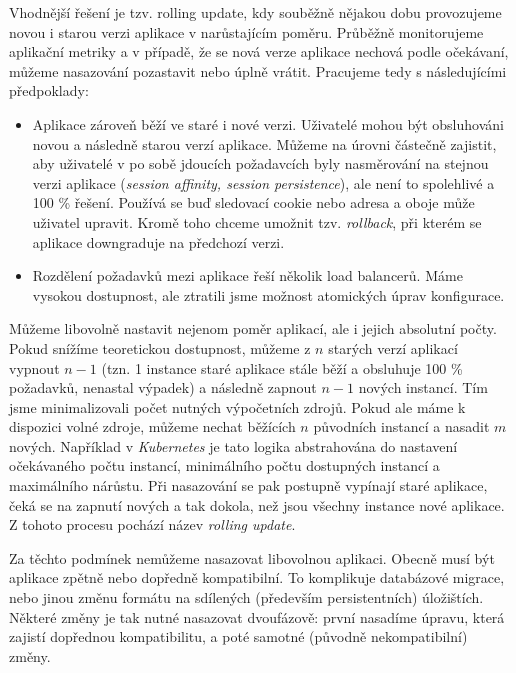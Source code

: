             Vhodnější řešení je tzv. rolling update, kdy souběžně nějakou dobu provozujeme novou i starou verzi aplikace v narůstajícím poměru. Průběžně monitorujeme aplikační metriky a v případě, že se nová verze aplikace nechová podle očekávaní, můžeme nasazování pozastavit nebo úplně vrátit. Pracujeme tedy s následujícími předpoklady:
            \begin{itemize}
                \item Aplikace zároveň běží ve staré i nové verzi. Uživatelé mohou být obsluhováni novou a následně starou verzí aplikace.  Můžeme na úrovni  částečně zajistit, aby uživatelé v po sobě jdoucích požadavcích byly nasměrování na stejnou verzi aplikace (\textit{session affinity, session persistence}), ale není to spolehlivé a 100 \% řešení. Používá se buď sledovací cookie nebo  adresa a oboje může uživatel upravit. Kromě toho chceme umožnit tzv. \textit{rollback}, při kterém se aplikace downgraduje na předchozí verzi.
                \item Rozdělení požadavků mezi aplikace řeší několik load balancerů. Máme vysokou dostupnost, ale ztratili jsme možnost atomických úprav konfigurace.
            \end{itemize}

            Můžeme libovolně nastavit nejenom poměr aplikací, ale i jejich absolutní počty. Pokud snížíme teoretickou dostupnost, můžeme z $n$ starých verzí aplikací vypnout $n-1$ (tzn. 1 instance staré aplikace stále běží a obsluhuje 100 \% požadavků, nenastal výpadek) a následně zapnout $n-1$ nových instancí. Tím jsme minimalizovali počet nutných výpočetních zdrojů. Pokud ale máme k dispozici volné zdroje, můžeme nechat běžících $n$ původních instancí a nasadit $m$ nových. Například v \textit{Kubernetes} je tato logika abstrahována do nastavení očekávaného počtu instancí, minimálního počtu dostupných instancí a maximálního nárůstu. Při nasazování se pak postupně vypínají staré aplikace, čeká se na zapnutí nových a tak dokola, než jsou všechny instance nové aplikace. Z tohoto procesu pochází název \textit{rolling update}.

            Za těchto podmínek nemůžeme nasazovat libovolnou aplikaci. Obecně musí být aplikace zpětně nebo dopředně kompatibilní. To komplikuje databázové migrace, nebo jinou změnu formátu na sdílených (především persistentních) úložištích. Některé změny je tak nutné nasazovat dvoufázově: první nasadíme úpravu, která zajistí dopřednou kompatibilitu, a poté samotné (původně nekompatibilní) změny.


